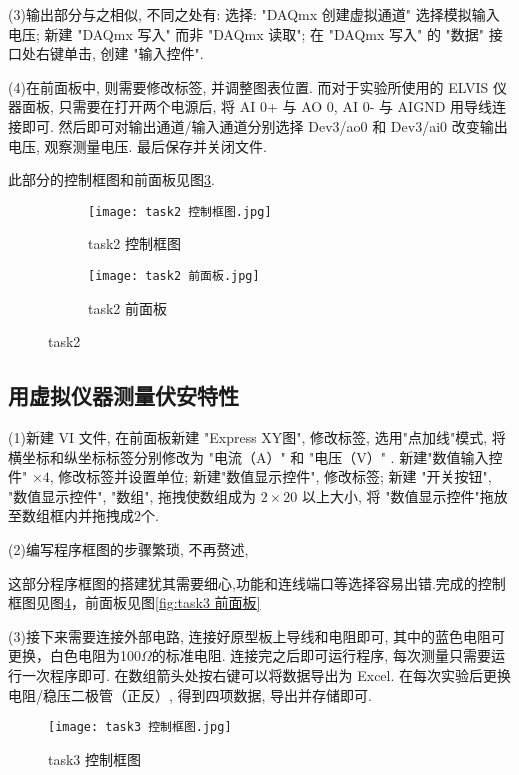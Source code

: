 \documentclass[11pt]{article}
\begin{document}
(3)输出部分与之相似, 不同之处有: 选择:  "DAQmx 创建虚拟通道" 
选择模拟输入电压; 新建 "DAQmx 写入" 而非 "DAQmx 读取"; 
在 "DAQmx 写入" 的  "数据"  接口处右键单击, 创建 "输入控件".


(4)在前面板中, 则需要修改标签, 并调整图表位置. 
而对于实验所使用的 ELVIS 仪器面板, 只需要在打开两个电源后, 
将 AI 0+ 与 AO 0, AI 0- 与 AIGND 用导线连接即可. 
然后即可对输出通道/输入通道分别选择 Dev3/ao0 和 Dev3/ai0 
改变输出电压, 观察测量电压. 最后保存并关闭文件.

此部分的控制框图和前面板见图\ref{fig:task2}.

\begin{figure}[htbp]
	\centering
	\begin{subfigure}[t]{0.45\textwidth}  %
		\centering
		\texttt{[image: task2 控制框图.jpg]}  %
		\caption{task2 控制框图}
		\label{fig:task2 控制框图}
	\end{subfigure}
	\begin{subfigure}[t]{0.45\textwidth}  %
		\centering
		\texttt{[image: task2 前面板.jpg]}  %
		\caption{task2 前面板}
		\label{fig:task2 前面板}
	\end{subfigure}
	\caption{task2}
	\label{fig:task2}
\end{figure}

\subsection{用虚拟仪器测量伏安特性}

(1)新建 VI 文件, 在前面板新建 "Express XY图", 
修改标签, 选用"点加线"模式, 将横坐标和纵坐标标签分别修改为 
"电流（A）" 和 "电压（V）" . 新建"数值输入控件" $\times 4$, 
修改标签并设置单位; 新建"数值显示控件", 修改标签; 新建 "开关按钮", 
"数值显示控件", "数组", 拖拽使数组成为 $2\times 20$ 以上大小, 
将 "数值显示控件"拖放至数组框内并拖拽成$2$个.

(2)编写程序框图的步骤繁琐, 不再赘述, 


这部分程序框图的搭建犹其需要细心,功能和连线端口等选择容易出错.完成的控制框图见图\ref{fig:task3 控制框图}，前面板见图\ref{fig:task3 前面板}

(3)接下来需要连接外部电路, 
连接好原型板上导线和电阻即可, 其中的蓝色电阻可更换，白色电阻为100$\Omega$的标准电阻. 
连接完之后即可运行程序, 每次测量只需要运行一次程序即可. 
在数组箭头处按右键可以将数据导出为 Excel. 
在每次实验后更换电阻/稳压二极管（正反）, 得到四项数据, 
导出并存储即可. 
\begin{figure}[htbp]
	\centering
	\texttt{[image: task3 控制框图.jpg]}
	\caption{task3 控制框图}
	\label{fig:task3 控制框图}
\end{figure}
\end{document}
